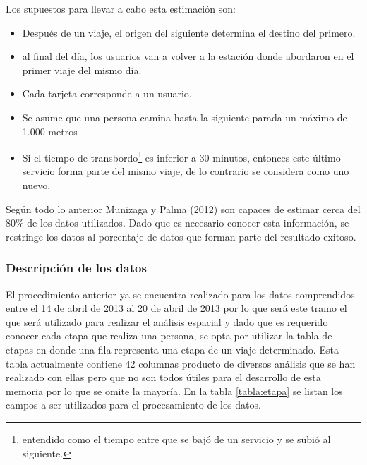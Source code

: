 \documentclass[12pt]{article}
\begin{document}
Los supuestos para llevar a cabo esta estimación son: 
\begin{itemize}
	\item Después de un viaje, el origen del siguiente determina el destino del primero. \cite{Supuesto_Barry}
	\item al final del día, los usuarios van a volver a la estación donde abordaron en el primer viaje del mismo día. \cite{Supuesto_Barry}
	\item Cada tarjeta corresponde a un usuario. \cite{Procesamiento_datos}
	\item Se asume que una persona camina hasta la siguiente parada un máximo de 1.000 metros \cite{Procesamiento_datos}
	\item Si el tiempo de transbordo\footnote{entendido como el tiempo entre que se bajó de un servicio y se subió al siguiente.} es inferior a 30 minutos, entonces este último servicio forma parte del mismo viaje, de lo contrario se considera como uno nuevo.\cite{Procesamiento_datos}
\end{itemize}

Según todo lo anterior Munizaga y Palma (2012)\cite{Procesamiento_datos} son capaces de estimar cerca del 80\% de los datos utilizados. Dado que es necesario conocer esta información, se restringe los datos al porcentaje de datos que forman parte del resultado exitoso.


\subsubsection{Descripción de los datos}

El procedimiento anterior ya se encuentra realizado para los datos comprendidos entre el 14 de abril de 2013 al 20 de abril de 2013 por lo que será este tramo el que será utilizado para realizar el análisis espacial y dado que es requerido conocer cada etapa que realiza una persona, se opta por utilizar la tabla de etapas en donde una fila representa una etapa de un viaje determinado. Esta tabla actualmente contiene 42 columnas producto de diversos análisis que se han realizado con ellas pero que no son todos útiles para el desarrollo de esta memoria por lo que se omite la mayoría. En la tabla \ref{tabla:etapa} se listan los campos a ser utilizados para el procesamiento de los datos.
\end{document}
